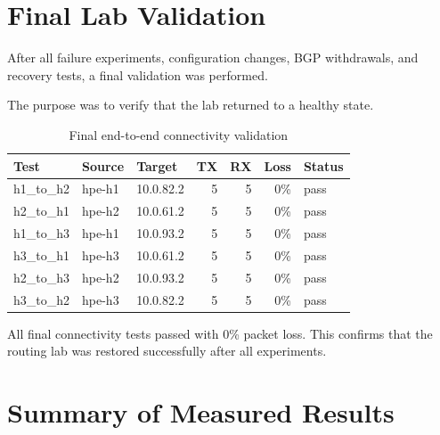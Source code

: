 \documentclass[12pt,a4paper]{article}
\begin{document}









\section{Final Lab Validation}

After all failure experiments, configuration changes, BGP withdrawals, and recovery tests, a final validation was performed.

The purpose was to verify that the lab returned to a healthy state.

\begin{table}[H]
\centering
\begin{tabular}{|l|l|l|r|r|r|l|}
\hline
\textbf{Test} & \textbf{Source} & \textbf{Target} & \textbf{TX} & \textbf{RX} & \textbf{Loss} & \textbf{Status} \\
\hline
h1\_to\_h2 & hpe-h1 & 10.0.82.2 & 5 & 5 & 0\% & pass \\
\hline
h2\_to\_h1 & hpe-h2 & 10.0.61.2 & 5 & 5 & 0\% & pass \\
\hline
h1\_to\_h3 & hpe-h1 & 10.0.93.2 & 5 & 5 & 0\% & pass \\
\hline
h3\_to\_h1 & hpe-h3 & 10.0.61.2 & 5 & 5 & 0\% & pass \\
\hline
h2\_to\_h3 & hpe-h2 & 10.0.93.2 & 5 & 5 & 0\% & pass \\
\hline
h3\_to\_h2 & hpe-h3 & 10.0.82.2 & 5 & 5 & 0\% & pass \\
\hline
\end{tabular}
\caption{Final end-to-end connectivity validation}
\end{table}

All final connectivity tests passed with 0\% packet loss. This confirms that the routing lab was restored successfully after all experiments.

\section{Summary of Measured Results}
\end{document}
